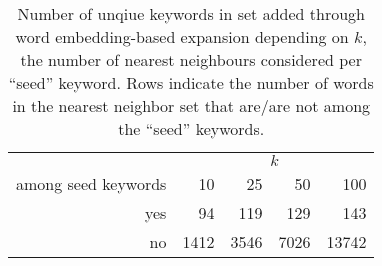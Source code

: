 \begin{table}[!t]

\caption{\label{tab:dictionary_expansion_effort_estimates}Number of unqiue keywords in set added through word embedding-based expansion depending on $k$, the number of nearest neighbours considered per ``seed'' keyword. Rows indicate the number of words in the nearest neighbor set that are/are not among the ``seed'' keywords.}
\centering
\fontsize{10}{12}\selectfont
\begin{tabular}[t]{rrrrr}
\toprule
\multicolumn{1}{c}{ } & \multicolumn{4}{c}{$k$} \\
\cmidrule(l{3pt}r{3pt}){2-5}
among seed keywords & 10 & 25 & 50 & 100\\
\midrule
yes & 94 & 119 & 129 & 143\\
no & 1412 & 3546 & 7026 & 13742\\
\bottomrule
\end{tabular}
\end{table}
